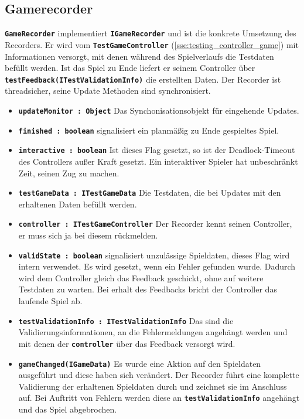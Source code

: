 \documentclass[
							a4paper, 
							11pt, 
							openany, 
							liststotoc,
							parskip=half, 
   							headings=normal
						]{scrreprt}
\begin{document}
{%
\subsection{Gamerecorder} \label{sse:testing_observer}
\textbf{\texttt{GameRecorder}} implementiert \textbf{\texttt{IGameRecorder}} und ist die konkrete Umsetzung des Recorders. Er wird vom \textbf{\texttt{TestGameController}} (\autoref{sse:testing_controller_game}) mit Informationen versorgt, mit denen während des Spielverlaufs die Testdaten befüllt werden.\newline
Ist das Spiel zu Ende liefert er seinem Controller über \textbf{\texttt{test\-Fe\-ed\-back\-(ITest\-Va\-li\-da\-ti\-on\-In\-fo)}} die erstellten Daten. Der Recorder ist threadsicher, seine Update Methoden sind synchronisiert.
\begin{itemize}
	\item \textbf{\texttt{updateMonitor : Object}} Das Synchonisationsobjekt für eingehende Updates.
	\item \textbf{\texttt{finished : boolean}} signalisiert ein planmäßig zu Ende gespieltes Spiel.
	\item \textbf{\texttt{interactive : boolean}} Ist dieses Flag gesetzt, so ist der Deadlock-Timeout des Controllers außer Kraft gesetzt. Ein interaktiver Spieler hat unbeschränkt Zeit, seinen Zug zu machen.
	\item \textbf{\texttt{testGameData : ITestGameData}} Die Testdaten, die bei Updates mit den erhaltenen Daten befüllt werden.
	\item \textbf{\texttt{controller : ITestGameController}} Der Recorder kennt seinen Controller, er muss sich ja bei diesem rückmelden.
	\item \textbf{\texttt{validState : boolean}} signalisiert unzulässige Spieldaten, dieses Flag wird intern verwendet. Es wird gesetzt, wenn ein Fehler gefunden wurde. Dadurch wird dem Controller gleich das Feedback geschickt, ohne auf weitere Testdaten zu warten. Bei erhalt des Feedbacks bricht der Controller das laufende Spiel ab.
	\item \textbf{\texttt{testValidationInfo : ITestValidationInfo}} Das sind die Validierungsinformationen, an die Fehlermeldungen angehängt werden und mit denen der \textbf{\texttt{controller}} über das Feedback versorgt wird.
	\item \textbf{\texttt{gameChanged(IGameData)}} Es wurde eine Aktion auf den Spieldaten ausgeführt und diese haben sich verändert. Der Recorder führt eine komplette Validierung der erhaltenen Spieldaten durch und zeichnet sie im Anschluss auf. Bei Auftritt von Fehlern werden diese an \textbf{\texttt{testValidationInfo}} angehängt und das Spiel abgebrochen.

\end{itemize}}
\end{document}

